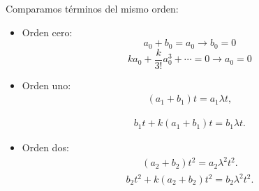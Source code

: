\documentclass[11pt]{beamer}
\theoremstyle{definition}
\begin{document}
\begin{frame}
Comparamos t\'erminos del mismo orden:
\begin{itemize}
	\item Orden cero:
	\begin{equation}
	a_{0}+b_{0}=a_{0} \rightarrow b_{0}=0
	\end{equation}
	\begin{equation}
	k a_{0}+\frac{k}{3!}a_{0}^{3}+\cdots=0  \rightarrow a_{0}=0
	\end{equation}
	\item  Orden uno:
	\begin{eqnarray}
	(a_{1}+b_{1})t=a_{1}\lambda t,
	\end{eqnarray}

	\begin{eqnarray}
	b_{1}t+k(a_{1}+b_{1})t=b_{1}\lambda t.
	\end{eqnarray}
	\item Orden dos:
	\begin{eqnarray}
	(a_{2}+b_{2})t^{2}=a_{2}\lambda^{2}t^{2}.
	\label{segundos_coeficientes_a}
	\end{eqnarray}
	\begin{eqnarray}
	b_{2}t^{2}+k(a_{2}+b_{2})t^{2}=b_{2}\lambda^{2}t^{2}.
	\label{segundos_coeficientes_b}
	\end{eqnarray}
\end{itemize}

\end{frame}
\end{document}
